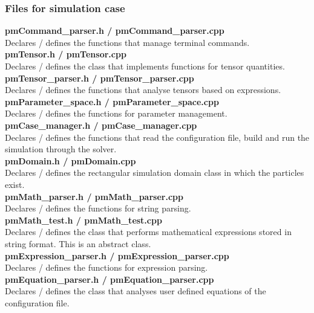\documentclass[a4paper,12pt,openany]{book}
\theoremstyle{break}
\begin{document}
\subsubsection{Files for simulation case}

\textbf{pmCommand\_parser.h / pmCommand\_parser.cpp} \\
Declares / defines the functions that manage terminal commands. \\

\textbf{pmTensor.h / pmTensor.cpp} \\
Declares / defines the class that implements functions for tensor quantities. \\

\textbf{pmTensor\_parser.h / pmTensor\_parser.cpp} \\
Declares / defines the functions that analyse tensors based on expressions. \\

\textbf{pmParameter\_space.h / pmParameter\_space.cpp} \\
Declares / defines the functions for parameter management. \\

\textbf{pmCase\_manager.h / pmCase\_manager.cpp} \\
Declares / defines the functions that read the configuration file, build and run the simulation through the solver. \\

\textbf{pmDomain.h / pmDomain.cpp} \\
Declares / defines the rectangular simulation domain class in which the particles exist. \\

\textbf{pmMath\_parser.h / pmMath\_parser.cpp} \\
Declares / defines the functions for string parsing. \\

\textbf{pmMath\_test.h / pmMath\_test.cpp} \\
Declares / defines the class that performs mathematical expressions stored in string format. This is an abstract class. \\

\textbf{pmExpression\_parser.h / pmExpression\_parser.cpp} \\
Declares / defines the functions for expression parsing. \\

\textbf{pmEquation\_parser.h / pmEquation\_parser.cpp} \\
Declares / defines the class that analyses user defined equations of the configuration file. \\
\end{document}
